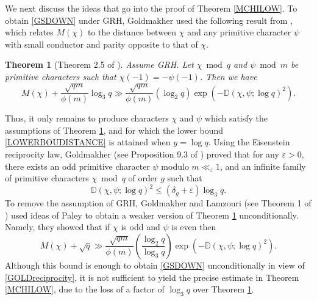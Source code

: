 \documentclass[12pt]{amsart}
\newtheorem{thm}{Theorem}[section]
\theoremstyle{definition}
\numberwithin{equation}{section}
\newcommand{\mb}{\mathbb}
\newcommand{\mc}{\mathcal}
\renewcommand{\bar}{\overline}
\begin{document}
We next discuss the ideas that go into the proof of Theorem \ref{MCHILOW}. 
To obtain \eqref{GSDOWN} under GRH, Goldmakher \cite{GOLD} used the following result from \cite{GrSo2}, which relates $M(\chi)$ to the distance between $\chi$ and any primitive character $\psi$ with small conductor and parity opposite to that of $\chi$. 
\begin{thm}[Theorem 2.5 of \cite{GrSo2}]\label{GrSoGRH}
Assume GRH. Let $\chi\bmod q$ and $\psi\bmod m$ be primitive characters such that $\chi(-1)=-\psi(-1)$. Then we have
$$
M(\chi) + \frac{\sqrt{qm}}{\phi(m)}\log_3q \gg \frac{\sqrt{qm}}{\phi(m)} (\log_2 q) \exp\left(-\mb{D}(\chi,\psi;\log q)^2\right).
$$
\end{thm}
\noindent Thus, it only remains to produce characters $\chi$ and $\psi$ which satisfy the assumptions of Theorem \ref{GrSoGRH}, and for which the lower bound \eqref{LOWERBOUDISTANCE} is attained when $y=\log q$.  Using the Eisenstein reciprocity law, Goldmakher (see Proposition 9.3 of \cite{GOLD}) proved that for any $\varepsilon>0$, there exists an odd primitive character $\psi$ modulo $m\ll_{\varepsilon}1$, and an infinite family of primitive characters $\chi\bmod q$ of order $g$ such that 
\begin{equation}\label{GOLDreciprocity}
\mb{D}(\chi,\psi;\log q)^2\leq (\delta_g+\varepsilon)\log_3q.
\end{equation}
To remove the assumption of GRH, Goldmakher and Lamzouri \cite{GL1} (see Theorem 1 of \cite{GL1}) used ideas of Paley \cite{Pa} to obtain a weaker version of Theorem \ref{GrSoGRH} unconditionally. Namely, they showed that if $\chi$ is odd and $\psi$ is even then
$$M(\chi) + \sqrt{q}\gg \frac{\sqrt{qm}}{\phi(m)}\left(\frac{\log_2 q}{\log_3 q}\right) \exp\left(-\mb{D}(\chi,\psi;\log q)^2\right).$$
Although this bound is enough to obtain \eqref{GSDOWN} unconditionally in view of \eqref{GOLDreciprocity}, it is not sufficient to yield the precise estimate in Theorem \ref{MCHILOW}, due to the loss of a factor of $\log_3 q$ over Theorem \ref{GrSoGRH}. \\
\end{document}
